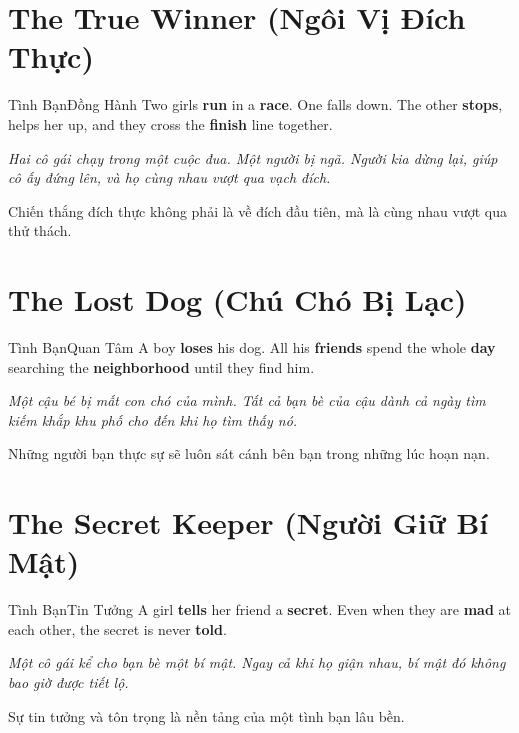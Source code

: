 \section{The True Winner (Ngôi Vị Đích Thực)}
\begin{truyen}{Tình Bạn}{Đồng Hành}
Two girls \textbf{run} in a \textbf{race}. One falls down. The other \textbf{stops}, helps her up, and they cross the \textbf{finish} line together.

\textit{Hai cô gái chạy trong một cuộc đua. Một người bị ngã. Người kia dừng lại, giúp cô ấy đứng lên, và họ cùng nhau vượt qua vạch đích.}

\begin{baihoc}
Chiến thắng đích thực không phải là về đích đầu tiên, mà là cùng nhau vượt qua thử thách.
\end{baihoc}
\end{truyen}

\section{The Lost Dog (Chú Chó Bị Lạc)}
\begin{truyen}{Tình Bạn}{Quan Tâm}
A boy \textbf{loses} his dog. All his \textbf{friends} spend the whole \textbf{day} searching the \textbf{neighborhood} until they find him.

\textit{Một cậu bé bị mất con chó của mình. Tất cả bạn bè của cậu dành cả ngày tìm kiếm khắp khu phố cho đến khi họ tìm thấy nó.}

\begin{baihoc}
Những người bạn thực sự sẽ luôn sát cánh bên bạn trong những lúc hoạn nạn.
\end{baihoc}
\end{truyen}

\section{The Secret Keeper (Người Giữ Bí Mật)}
\begin{truyen}{Tình Bạn}{Tin Tưởng}
A girl \textbf{tells} her friend a \textbf{secret}. Even when they are \textbf{mad} at each other, the secret is never \textbf{told}.

\textit{Một cô gái kể cho bạn bè một bí mật. Ngay cả khi họ giận nhau, bí mật đó không bao giờ được tiết lộ.}

\begin{baihoc}
Sự tin tưởng và tôn trọng là nền tảng của một tình bạn lâu bền.
\end{baihoc}
\end{truyen}

